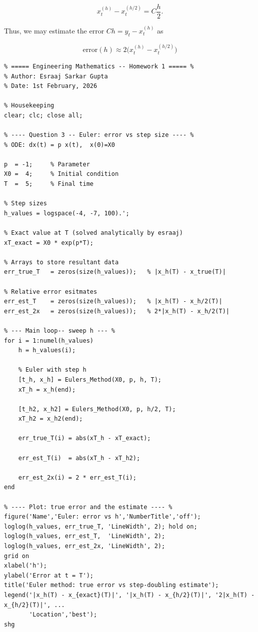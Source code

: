 \documentclass{article}
\begin{document}
\begin{equation}
    x_t^{(h)} - x_t^{(h/2)} = C \frac{h}{2}.
\end{equation}

Thus, we may estimate the error $Ch = y_t - x_t^{(h)}$ as

\begin{equation}
    \text{error}(h) \approx 2 \bigg(x_t^{(h)} - x_t^{(h/2)} \bigg)
\end{equation}

\begin{lstlisting}
% ===== Engineering Mathematics -- Homework 1 ===== %
% Author: Esraaj Sarkar Gupta
% Date: 1st February, 2026

% Housekeeping
clear; clc; close all;

% ---- Question 3 -- Euler: error vs step size ---- %
% ODE: dx(t) = p x(t),  x(0)=X0

p  = -1;     % Parameter
X0 =  4;     % Initial condition
T  =  5;     % Final time

% Step sizes
h_values = logspace(-4, -7, 100).';

% Exact value at T (solved analytically by esraaj)
xT_exact = X0 * exp(p*T);

% Arrays to store resultant data
err_true_T   = zeros(size(h_values));   % |x_h(T) - x_true(T)|

% Relative error esitmates
err_est_T    = zeros(size(h_values));   % |x_h(T) - x_h/2(T)|
err_est_2x   = zeros(size(h_values));   % 2*|x_h(T) - x_h/2(T)|

% --- Main loop-- sweep h --- %
for i = 1:numel(h_values)
    h = h_values(i);

    % Euler with step h
    [t_h, x_h] = Eulers_Method(X0, p, h, T);
    xT_h = x_h(end);

    [t_h2, x_h2] = Eulers_Method(X0, p, h/2, T);
    xT_h2 = x_h2(end);

    err_true_T(i) = abs(xT_h - xT_exact);

    err_est_T(i)  = abs(xT_h - xT_h2);

    err_est_2x(i) = 2 * err_est_T(i);
end

% ---- Plot: true error and the estimate ---- %
figure('Name','Euler: error vs h','NumberTitle','off');
loglog(h_values, err_true_T, 'LineWidth', 2); hold on;
loglog(h_values, err_est_T,  'LineWidth', 2);
loglog(h_values, err_est_2x, 'LineWidth', 2);
grid on
xlabel('h');
ylabel('Error at t = T');
title('Euler method: true error vs step-doubling estimate');
legend('|x_h(T) - x_{exact}(T)|', '|x_h(T) - x_{h/2}(T)|', '2|x_h(T) - x_{h/2}(T)|', ...
       'Location','best');
shg


\end{lstlisting}
\end{document}
